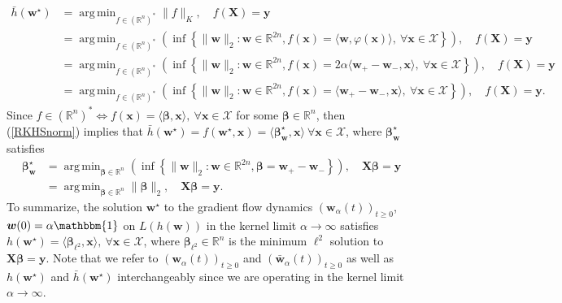 \documentclass{article}
\DeclareMathOperator*{\argmin}{arg\,min}
\begin{document}
\begin{align}
    \bar{h}(\boldsymbol{w}^{\star}) &= \argmin_{f \in (\mathbb{R}^n)^*} \| f \|_{K}, \quad f(\boldsymbol{X}) = \boldsymbol{y} \nonumber\\
    &= \argmin_{f \in (\mathbb{R}^n)^*} \left( \inf \left\{ \| \boldsymbol{w} \|_2 : \boldsymbol{w} \in \mathbb{R}^{2n},  f(\boldsymbol{x}) = \langle \boldsymbol{w}, \varphi(\boldsymbol{x}) \rangle, \ \forall \boldsymbol{x} \in \mathcal{X} \right\}\right), \quad f(\boldsymbol{X}) = \boldsymbol{y} \nonumber\\
    &= \argmin_{f \in (\mathbb{R}^n)^*} \left( \inf \left\{ \| \boldsymbol{w} \|_2 : \boldsymbol{w} \in \mathbb{R}^{2n},  f(\boldsymbol{x}) = 2\alpha \langle \boldsymbol{w}_+ - \boldsymbol{w}_-, \boldsymbol{x} \rangle, \ \forall \boldsymbol{x} \in \mathcal{X} \right\}\right), \quad f(\boldsymbol{X}) = \boldsymbol{y} \nonumber\\
    &= \argmin_{f \in (\mathbb{R}^n)^*} \left( \inf \left\{ \| \boldsymbol{w} \|_2 : \boldsymbol{w} \in \mathbb{R}^{2n},  f(\boldsymbol{x}) = \langle \boldsymbol{w}_+ - \boldsymbol{w}_-, \boldsymbol{x} \rangle, \ \forall \boldsymbol{x} \in \mathcal{X} \right\}\right), \quad f(\boldsymbol{X}) = \boldsymbol{y}.\label{RKHSnorm}
\end{align}
Since $f \in (\mathbb{R}^n)^* \Leftrightarrow f(\boldsymbol{x}) = \langle \boldsymbol{\beta}, \boldsymbol{x} \rangle, \ \forall \boldsymbol{x} \in \mathcal{X}$ for some $\boldsymbol{\beta} \in \mathbb{R}^n$, then (\ref{RKHSnorm}) implies that $\bar{h}(\boldsymbol{w}^{\star}) = f(\boldsymbol{w}^{\star}, \boldsymbol{x}) =  \langle \boldsymbol{\beta}_{\boldsymbol{w}}^{\star}, \boldsymbol{x} \rangle \ \forall \boldsymbol{x} \in \mathcal{X}$, where $\boldsymbol{\beta}_{\boldsymbol{w}}^{\star}$ satisfies
\begin{align*}
    \boldsymbol{\beta}_{\boldsymbol{w}}^{\star} &= \argmin_{\boldsymbol{\beta} \in \mathbb{R}^n} \left( \inf \left\{ \| \boldsymbol{w} \|_2 : \boldsymbol{w} \in \mathbb{R}^{2n},  \boldsymbol{\beta} = \boldsymbol{w}_+ - \boldsymbol{w}_- \right\}\right), \quad \boldsymbol{X}\boldsymbol{\beta} = \boldsymbol{y}\\
    &= \argmin_{\boldsymbol{\beta} \in \mathbb{R}^n} \| \boldsymbol{\beta} \|_2, \quad \boldsymbol{X}\boldsymbol{\beta} = \boldsymbol{y}.
\end{align*}
To summarize, the solution $\boldsymbol{w}^{\star}$ to the gradient flow dynamics $(\boldsymbol{w}_{\alpha}(t))_{t \geq 0}$, $\boldsymbol{w}(0) = \alpha \mathbbm{1}$ on $L(h(\boldsymbol{w}))$ in the kernel limit $\alpha \rightarrow \infty$ satisfies $h(\boldsymbol{w}^{\star}) =\langle \boldsymbol{\beta}_{\ell^2}, \boldsymbol{x} \rangle, \ \forall \boldsymbol{x} \in \mathcal{X}$, where $\boldsymbol{\beta}_{\ell^2} \in \mathbb{R}^n$ is the minimum $\ell^2$ solution to $\boldsymbol{X} \boldsymbol{\beta} = \boldsymbol{y}$. Note that we refer to $(\boldsymbol{w}_{\alpha}(t))_{t \geq 0}$ and $(\boldsymbol{\bar{w}}_{\alpha}(t))_{t \geq 0}$ as well as $h(\boldsymbol{w}^{\star})$ and $\bar{h}(\boldsymbol{w}^{\star})$ interchangeably since we are operating in the kernel limit $\alpha \rightarrow \infty$.
\end{document}
